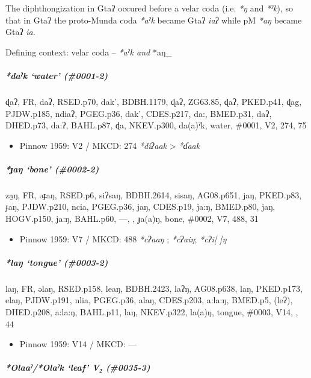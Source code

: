 \documentclass[a4paper,]{article}
\providecommand{\tightlist}{%
  \setlength{\itemsep}{0pt}\setlength{\parskip}{0pt}}
\let\oldsubparagraph\subparagraph
\renewcommand{\subparagraph}[1]{\oldsubparagraph{#1}\mbox{}}
\begin{document}
The diphthongization in Gtaʔ occured before a velar coda (i.e. \emph{*ŋ}
and \emph{*ˀk}), so that in Gtaʔ the proto-Munda coda \emph{*aˀk} became
Gtaʔ \emph{iaʔ} while pM \emph{*aŋ} became Gtaʔ \emph{ia}.

Defining context: velar coda -- \emph{*aˀk and }*aŋ\_

\subparagraph{\texorpdfstring{\emph{*daˀk} `water'
(\#0001-2)}{*daˀk water (\#0001-2)}}\label{daux2c0k-water-0001-2}

ɖaʔ, FR, daʔ, RSED.p70, dak', BDBH.1179, ɖaʔ, ZG63.85, ɖaʔ, PKED.p41,
ɖag, PJDW.p185, ndiaʔ, PGEG.p36, dak', CDES.p217, da:, BMED.p31, daʔ,
DHED.p73, da:ʔ, BAHL.p87, ɖa, NKEV.p300, da(a)ˀk, water, \#0001, V2,
274, 75

\begin{itemize}
\tightlist
\item
  Pinnow 1959: V2 / MKCD: 274 \emph{*diʔaak} \textgreater{} \emph{*ɗaak}
\end{itemize}

\subparagraph{\texorpdfstring{\emph{*ɟaŋ} `bone'
(\#0002-2)}{*ɟaŋ bone (\#0002-2)}}\label{ux25faux14b-bone-0002-2}

za̰ŋ, FR, əɟaŋ, RSED.p6, siʔsaŋ, BDBH.2614, sisaŋ, AG08.p651, jaŋ,
PKED.p83, ɟaŋ, PJDW.p210, ncia, PGEG.p36, jaŋ, CDES.p19, ja:ŋ, BMED.p80,
jaŋ, HOGV.p150, ja:ŋ, BAHL.p60, ---, , ɟa(a)ŋ, bone, \#0002, V7, 488, 31

\begin{itemize}
\tightlist
\item
  Pinnow 1959: V7 / MKCD: 488 \emph{*cʔaaŋ} ; \emph{*cʔaiŋ};
  \emph{*cʔi{[} {]}ŋ}
\end{itemize}

\subparagraph{\texorpdfstring{\emph{*laŋ} `tongue'
(\#0003-2)}{*laŋ tongue (\#0003-2)}}\label{laux14b-tongue-0003-2}

laŋ, FR, əlaŋ, RSED.p158, leaŋ, BDBH.2423, laʔŋ, AG08.p638, laŋ,
PKED.p173, elaŋ, PJDW.p191, nlia, PGEG.p36, alaŋ, CDES.p203, a:la:ŋ,
BMED.p5, (leʔ), DHED.p208, a:la:ŋ, BAHL.p11, laŋ, NKEV.p322, la(a)ŋ,
tongue, \#0003, V14, , 44

\begin{itemize}
\tightlist
\item
  Pinnow 1959: V14 / MKCD: ---
\end{itemize}

\subparagraph{\texorpdfstring{\emph{*Olaaˀ}/\emph{*Olaˀk} `leaf' V₂
(\#0035-3)}{*Olaaˀ/*Olaˀk leaf V₂ (\#0035-3)}}\label{olaaux2c0olaux2c0k-leaf-v-0035-3}
\end{document}
